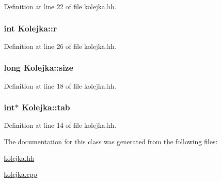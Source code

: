 Definition at line 22 of file kolejka.\-hh.

\hypertarget{class_kolejka_ae16213a5b751800eb48da6bede435ad0}{
\subsubsection[{r}]{\setlength{\rightskip}{0pt plus 5cm}int Kolejka\-::r\hspace{0.3cm}{\ttfamily [private]}}}\label{class_kolejka_ae16213a5b751800eb48da6bede435ad0}


Definition at line 26 of file kolejka.\-hh.

\hypertarget{class_kolejka_a84898848de8e77a76a6f2e4a7393b4bb}{
\subsubsection[{size}]{\setlength{\rightskip}{0pt plus 5cm}long Kolejka\-::size\hspace{0.3cm}{\ttfamily [private]}}}\label{class_kolejka_a84898848de8e77a76a6f2e4a7393b4bb}


Definition at line 18 of file kolejka.\-hh.

\hypertarget{class_kolejka_a49e444e7bd7b91a78bc2a46426b73128}{
\subsubsection[{tab}]{\setlength{\rightskip}{0pt plus 5cm}int$\ast$ Kolejka\-::tab\hspace{0.3cm}{\ttfamily [private]}}}\label{class_kolejka_a49e444e7bd7b91a78bc2a46426b73128}


Definition at line 14 of file kolejka.\-hh.



The documentation for this class was generated from the following files\-:\begin{DoxyCompactItemize}
\item 
\hyperlink{kolejka_8hh}{kolejka.\-hh}\item 
\hyperlink{kolejka_8cpp}{kolejka.\-cpp}\end{DoxyCompactItemize}
